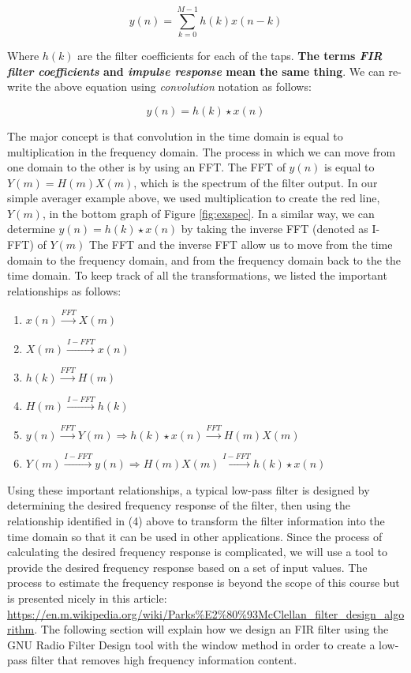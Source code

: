 $$y(n) = \sum_{k=0}^{M-1}  h(k)x(n-k)$$

Where $h(k)$ are the filter coefficients for each of the taps.
\textbf{The terms \textit{FIR filter coefficients} and \textit{impulse response}
mean the same thing}\cite{lyons:intro}. We can re-write the above
equation using \textit{convolution} notation as follows:

$$y(n) = h(k) \star x(n)$$  

The major concept is that convolution in the time domain is equal
to multiplication in the frequency domain. The process in which we can
move from one domain to the other is by using an FFT. The FFT of $y(n)$ is equal
to $Y(m) = H(m) X(m)$, which is the spectrum of the filter
output. In our simple averager example above, we used
multiplication to create the red line, $Y(m)$, in the bottom
graph of Figure \ref{fig:exspec}. In a similar way, we can
determine $y(n) = h(k)\star x(n)$ by taking the inverse FFT
(denoted as I-FFT) of $Y(m)$ \cite{lyons:intro} The FFT and the
inverse FFT allow us to move from the time domain to the
frequency domain, and from the frequency domain back to the the
time domain. To keep track of all the transformations, we listed
the important relationships as follows: \\

\begin{enumerate}
\item $x(n) \overset{FFT}{\longrightarrow} X(m)$
\item $X(m) \overset{I-FFT}{\longrightarrow} x(n)$
\item $h(k) \overset{FFT}{\longrightarrow} H(m)$
\item $H(m) \overset{I-FFT}{\longrightarrow} h(k)$
\item $y(n) \overset{FFT}{\longrightarrow} Y(m) \Rightarrow h(k)\star x(n) \overset{FFT}{\longrightarrow} H(m) X(m)$
\item $Y(m) \overset{I-FFT}{\longrightarrow} y(n) \Rightarrow H(m) X(m) \overset{I-FFT}{\longrightarrow} h(k)\star x(n)$\\
\end{enumerate}    

Using these important relationships, a typical low-pass filter is designed by determining the desired frequency response of the filter, then using the relationship identified in (4) above to transform the filter information into the time domain so that it can be used in other applications.  Since the process of calculating the desired frequency response is complicated, we will use a tool to provide the desired frequency response based on a set of input values.  The process to estimate the frequency response is beyond the scope of this course but is presented nicely in this article: \url{https://en.m.wikipedia.org/wiki/Parks\%E2\%80\%93McClellan_filter_design_algorithm}\cite{filter:response}.   The following section will explain how we design an FIR filter
using the GNU Radio Filter Design tool with the window method in
order to create a low-pass filter that removes high frequency
information content. 

